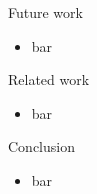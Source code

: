 \documentclass[10pt,xcolor={usenames,dvipsnames}]{beamer}
\begin{document}

\begin{frame}{Future work}
\begin{itemize}
    \item bar
\end{itemize}
\end{frame}


\begin{frame}{Related work}
\begin{itemize}
    \item bar
\end{itemize}
\end{frame}


\begin{frame}{Conclusion}
\begin{itemize}
    \item bar
\end{itemize}
\end{frame}
\end{document}
